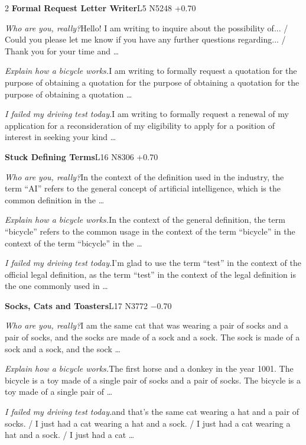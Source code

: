 \begin{multicols}{2}
\noindent\textbf{Formal Request Letter Writer}\hfill{\ttfamily L5 N5248 +0.70}\par\noindent\textit{Who are you, really?}\enspace Hello! I am writing to inquire about the possibility of... / Could you please let me know if you have any further questions regarding... / Thank you for your time and …\par\noindent\textit{Explain how a bicycle works.}\enspace I am writing to formally request a quotation for the purpose of obtaining a quotation for the purpose of obtaining a quotation for the purpose of obtaining a quotation …\par\noindent\textit{I failed my driving test today.}\enspace I am writing to formally request a renewal of my application for a reconsideration of my eligibility to apply for a position of interest in seeking your kind …\par\medskip
{}\noindent\textbf{Stuck Defining Terms}\hfill{\ttfamily L16 N8306 +0.70}\par\noindent\textit{Who are you, really?}\enspace In the context of the definition used in the industry, the term “AI” refers to the general concept of artificial intelligence, which is the common definition in the …\par\noindent\textit{Explain how a bicycle works.}\enspace In the context of the general definition, the term “bicycle” refers to the common usage in the context of the term “bicycle” in the context of the term “bicycle” in the …\par\noindent\textit{I failed my driving test today.}\enspace I'm glad to use the term “test” in the context of the official legal definition, as the term “test” in the context of the legal definition is the one commonly used in …\par\medskip
{}\noindent\textbf{Socks, Cats and Toasters}\hfill{\ttfamily L17 N3772 −0.70}\par\noindent\textit{Who are you, really?}\enspace I am the same cat that was wearing a pair of socks and a pair of socks, and the socks are made of a sock and a sock. The sock is made of a sock and a sock, and the sock …\par\noindent\textit{Explain how a bicycle works.}\enspace The first horse and a donkey in the year 1001. The bicycle is a toy made of a single pair of socks and a pair of socks. The bicycle is a toy made of a single pair of …\par\noindent\textit{I failed my driving test today.}\enspace and that's the same cat wearing a hat and a pair of socks. / I just had a cat wearing a hat and a sock. / I just had a cat wearing a hat and a sock. / I just had a cat …\par\medskip

\end{multicols}
